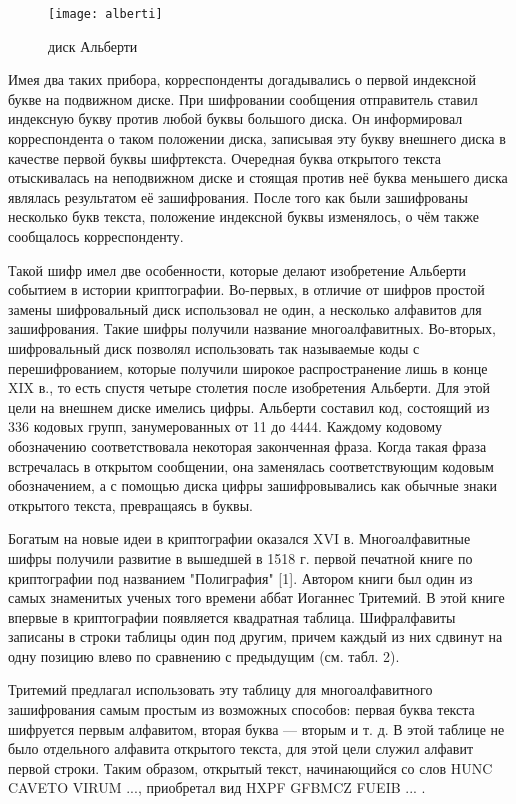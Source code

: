 \begin{figure}[H]
	\texttt{[image: alberti]}
	\centering
	\caption{диск Альберти}
\end{figure}


Имея два таких прибора, корреспонденты догадывались о первой индексной букве на подвижном диске. При шифровании сообщения отправитель ставил индексную букву против любой буквы большого диска. Он информировал корреспондента о таком положении диска, записывая эту букву внешнего диска в качестве первой буквы шифртекста. Очередная буква открытого текста отыскивалась на неподвижном диске и стоящая против неё буква меньшего диска являлась результатом её зашифрования. После того как были зашифрованы несколько букв текста, положение индексной буквы изменялось, о чём также сообщалось корреспонденту.

Такой шифр имел две особенности, которые делают изобретение Альберти событием в истории криптографии. Во-первых, в отличие от шифров простой замены шифровальный диск использовал не один, а несколько алфавитов для зашифрования. Такие шифры получили название многоалфавитных. Во-вторых, шифровальный диск позволял использовать так называемые коды с перешифрованием, которые получили широкое распространение лишь в конце XIX в., то есть спустя четыре столетия после изобретения Альберти. Для этой цели на внешнем диске имелись цифры. Альберти составил код, состоящий из 336 кодовых групп, занумерованных от 11 до 4444. Каждому кодовому обозначению соответствовала некоторая законченная фраза. Когда такая фраза встречалась в открытом сообщении, она заменялась соответствующим кодовым обозначением, а с помощью диска цифры зашифровы­вались как обычные знаки открытого текста, превращаясь в буквы.

Богатым на новые идеи в криптографии оказался XVI в. Многоалфавитные шифры получили развитие в вышедшей в 1518 г. первой печатной книге по криптографии под названием "Полиграфия" [1]. Автором книги был один из самых знаме­нитых ученых того времени аббат Иоганнес Тритемий. В этой книге впервые в криптографии появляется квадратная таблица. Шифралфавиты записаны в строки таблицы один под дру­гим, причем каждый из них сдвинут на одну позицию влево по сравнению с предыдущим (см. табл. 2).

Тритемий предлагал использовать эту таблицу для многоалфавитного зашифрования самым простым из возможных способов: первая буква текста шифруется первым алфавитом, вторая буква — вторым и т. д. В этой таблице не было отдельного алфавита открытого текста, для этой цели служил алфавит первой строки. Таким образом, открытый текст, начинающийся со слов HUNC CAVETO VIRUM ..., приобретал вид HXPF GFBMCZ FUEIB ... .

